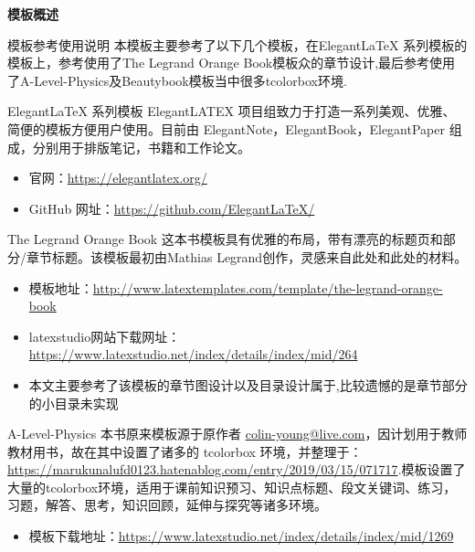 
\frontmatter
\thispagestyle{empty}
\newpage
\begin{center}
	\textbf{\LARGE 模板概述}
\end{center}
\begin{ascolorbox5}{模板参考使用说明}
	本模板主要参考了以下几个模板，在Elegant\LaTeX{} 系列模板的模板上，参考使用了The Legrand Orange Book模板众的章节设计,最后参考使用了A-Level-Physics及Beautybook模板当中很多tcolorbox环境.
	\begin{ascboxB}{Elegant\LaTeX{} 系列模板\md{[核心版本]}}
		ElegantLATEX 项目组致力于打造一系列美观、优雅、简便的模板方便用户使用。目前由
		ElegantNote，ElegantBook，ElegantPaper 组成，分别用于排版笔记，书籍和工作论文。
		\begin{itemize}
			\item 官网：\href{https://elegantlatex.org/}{https://elegantlatex.org/}
			\item GitHub 网址：\href{https://github.com/ElegantLaTeX/}{https://github.com/ElegantLaTeX/}
		\end{itemize} 
	\end{ascboxB}
	\begin{ascboxB}{The Legrand Orange Book}
		这本书模板具有优雅的布局，带有漂亮的标题页和部分/章节标题。该模板最初由Mathias Legrand创作，灵感来自此处和此处的材料。
		\begin{itemize}
			\item  模板地址：\href{http://www.latextemplates.com/template/the-legrand-orange-book}{http://www.latextemplates.com/template/the-legrand-orange-book}
			\item  latexstudio网站下载网址：\href{https://www.latexstudio.net/index/details/index/mid/264}{https://www.latexstudio.net/index/details/index/mid/264}
			\item 本文主要参考了该模板的章节图设计以及目录设计属于,比较遗憾的是章节部分的小目录未实现
		\end{itemize} 
	\end{ascboxB}
	\begin{ascboxB}{A-Level-Physics}
		本书原来模板源于原作者  \url{colin-young@live.com}，因计划用于教师教材用书，故在其中设置了诸多的 tcolorbox 环境，并整理于：\url{https://marukunalufd0123.hatenablog.com/entry/2019/03/15/071717}.模板设置了大量的tcolorbox环境，适用于课前知识预习、知识点标题、段文关键词、练习，习题，解答、思考，知识回顾，延伸与探究等诸多环境。
		\begin{itemize}
			\item 模板下载地址：\href{https://www.latexstudio.net/index/details/index/mid/1269}{https://www.latexstudio.net/index/details/index/mid/1269}

\end{itemize}
\end{ascboxB}
\end{ascolorbox5}
